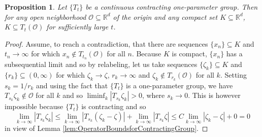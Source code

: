 \documentclass[11pt, letter]{book}
\newtheorem{proposition}[theorem]{Proposition}
\begin{document}
\begin{proposition}\label{prop:ContractingCapturesCompact}
Let $\{T_t\}$ be a continuous contracting one-parameter group. Then for any open neighborhood $\mathcal{O}\subseteq\mathbb{R}^d$ of the origin and any compact set $K\subseteq\mathbb{R}^d$, $K\subseteq T_t(\mathcal{O})$ for sufficiently large $t$.
\end{proposition}
\begin{proof}
Assume, to reach a contradiction, that there are sequences $\{x_n\}\subseteq K$ and $t_n\rightarrow\infty$ for which $x_n\notin T_{t_n}(\mathcal{O})$ for all $n$. Because $K$ is compact, $\{x_n\}$ has a subsequential limit and so by relabeling, let us take sequences $\{\zeta_k\}\subseteq K$ and $\{r_k\}\subseteq (0,\infty)$ for which $\zeta_k\rightarrow \zeta$, $r_k\rightarrow\infty$ and $\zeta_k\notin T_{r_k}(\mathcal{O})$ for all $k$. Setting $s_k=1/r_k$ and using the fact that $\{T_t\}$ is a one-parameter group, we have $T_{s_k}\zeta_k\notin\mathcal{O}$ for all $k$ and so $\liminf_{k}|T_{s_k}\zeta_k|>0$, where $s_k\rightarrow 0$. This is however impossible because $\{T_t\}$ is contracting and so
\begin{equation*}
\lim_{k\rightarrow\infty}|T_{s_k}\zeta_k|\leq\lim_{k\rightarrow \infty}|T_{s_k}(\zeta_k-\zeta)|+\lim_{k\rightarrow\infty}|T_{s_k}\zeta|\leq C
\lim_{k\rightarrow\infty}|\zeta_k-\zeta|+0=0
\end{equation*}
in view of Lemma \ref{lem:OperatorBoundsforContractingGroup}.
\end{proof}




\end{document}
